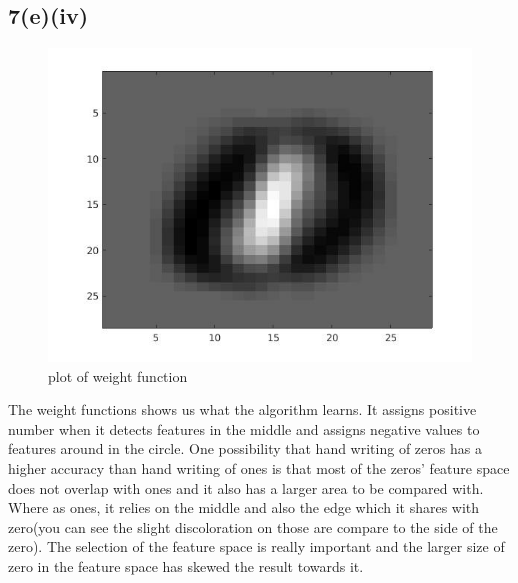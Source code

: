 \subsection*{7(e)(iv)}
\begin{figure}[H]
\centering
\includegraphics[width=6.5in]{figures/q7-6.jpg}
\caption{plot of weight function}
\end{figure}
The weight functions shows us what the algorithm learns. It assigns positive number when it detects features in the middle and assigns negative values to features around in the circle. One possibility that hand writing of zeros has a higher accuracy than hand writing of ones is that most of the zeros' feature space does not overlap with ones and it also has a larger area to be compared with. Where as ones, it relies on the middle and also the edge which it shares with zero(you can see the slight discoloration on those are compare to the side of the zero). The selection of the feature space is really important and the larger size of zero in the feature space has skewed the result towards it.
